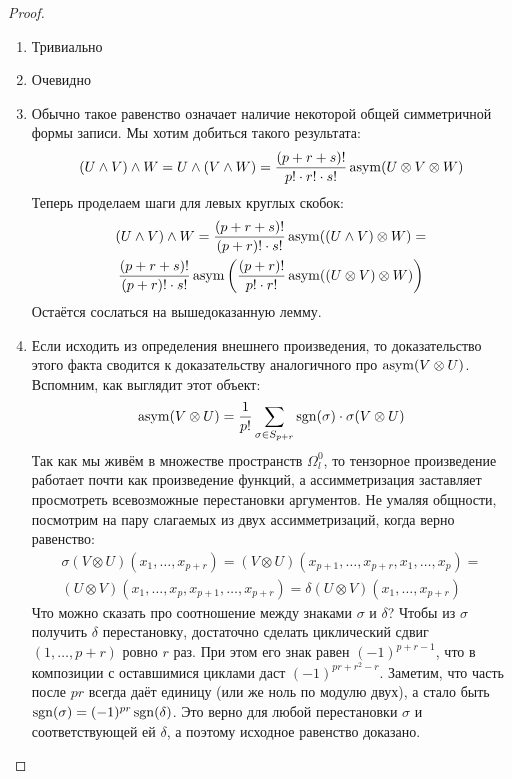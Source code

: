 \begin{proof}~
	\begin{enumerate}
		\item Тривиально
		
		\item Очевидно
		
		\item Обычно такое равенство означает наличие некоторой общей симметричной формы записи. Мы хотим добиться такого результата:
		\[
			(U \wedge V) \wedge W = U \wedge (V \wedge W) = \frac{(p + r + s)!}{p! \cdot r! \cdot s!} \operatorname{asym}(U \otimes V \otimes W)
		\]
		Теперь проделаем шаги для левых круглых скобок:
		\begin{multline*}
			(U \wedge V) \wedge W = \frac{(p + r + s)!}{(p + r)! \cdot s!} \operatorname{asym}((U \wedge V) \otimes W) =
			\\
			\frac{(p + r + s)!}{(p + r)! \cdot s!} \operatorname{asym}\left(\frac{(p + r)!}{p! \cdot r!} \operatorname{asym}((U \otimes V) \otimes W)\right)
		\end{multline*}
		Остаётся сослаться на вышедоказанную лемму.
		
		\item Если исходить из определения внешнего произведения, то доказательство этого факта сводится к доказательству аналогичного про $\operatorname{asym}(V \otimes U)$. Вспомним, как выглядит этот объект:
		\[
			\operatorname{asym}(V \otimes U) = \frac{1}{p!} \sum_{\sigma \in S_{p + r}} \operatorname{sgn}(\sigma) \cdot \sigma (V \otimes U)
		\]
		Так как мы живём в множестве пространств $\Omega_l^0$, то тензорное произведение работает почти как произведение функций, а ассимметризация заставляет просмотреть всевозможные перестановки аргументов. Не умаляя общности, посмотрим на пару слагаемых из двух ассимметризаций, когда верно равенство:
		\begin{multline*}
			\sigma(V \otimes U)(x_1, \ldots, x_{p + r}) = (V \otimes U)(x_{p + 1}, \ldots, x_{p + r}, x_1, \ldots, x_p) =
			\\
			(U \otimes V)(x_1, \ldots, x_p, x_{p + 1}, \ldots, x_{p + r}) = \delta(U \otimes V)(x_1, \ldots, x_{p + r})
		\end{multline*}
		Что можно сказать про соотношение между знаками $\sigma$ и $\delta$? Чтобы из $\sigma$ получить $\delta$ перестановку, достаточно сделать циклический сдвиг $(1, \ldots, p + r)$ ровно $r$ раз. При этом его знак равен $(-1)^{p + r - 1}$, что в композиции с оставшимися циклами даст $(-1)^{pr + r^2 - r}$. Заметим, что часть после $pr$ всегда даёт единицу (или же ноль по модулю двух), а стало быть $\operatorname{sgn}(\sigma) = (-1)^{pr} \operatorname{sgn}(\delta)$. Это верно для любой перестановки $\sigma$ и соответствующей ей $\delta$, а поэтому исходное равенство доказано.
	\end{enumerate}
\end{proof}

